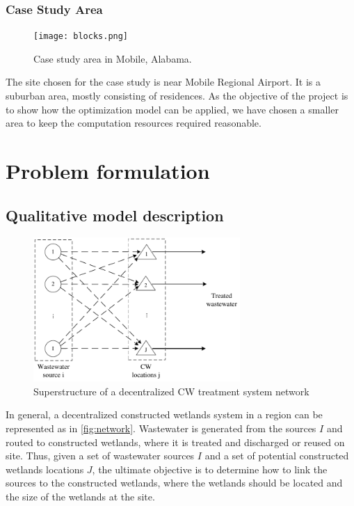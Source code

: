 \documentclass[preprint,12pt,authoryear]{elsarticle}
\begin{document}
\subsubsection{Case Study Area}
\begin{figure}%
	\centering
	\texttt{[image: blocks.png]}
	\caption{Case study area in Mobile, Alabama.}
	\label{fig:blocks}
\end{figure}

The site chosen for the case study is near Mobile Regional Airport. It is a suburban area, mostly consisting of residences. As the objective of the project is to show how the optimization model can be applied, we have chosen a smaller area to keep the computation resources required reasonable. 

\section{Problem formulation}\label{section:problem}
\subsection{Qualitative model description}

\begin{figure}[!htpb]
	\centering
	\includegraphics[width=0.7\textwidth]{CWnetwork.pdf}
	\caption{Superstructure of a decentralized CW treatment system network}
	\label{fig:network}
\end{figure}

In general, a decentralized constructed wetlands system in a region can be represented as in \autoref{fig:network}. Wastewater is generated from the sources $I$ and routed to constructed wetlands, where it is treated and discharged or reused on site. Thus, given a set of wastewater sources $I$ and a set of potential constructed wetlands locations $J$, the ultimate objective is to determine how to link the sources to the constructed wetlands, where the wetlands should be located and the size of the wetlands at the site. 
\end{document}
